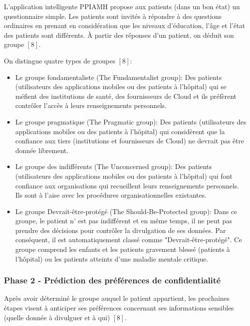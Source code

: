 L'application intelligente PPIAMH propose aux patients (dans un bon état) un questionnaire simple. Les patients sont invités à répondre à des questions ordinaires en prenant en considération que les niveaux d'éducation, l'âge et l'état des patients sont différents. À partir des réponses d'un patient, on déduit son groupe $[8]$.

\vspace{6pt}
\paragraphmark

On distingue quatre types de groupes $[8]$:

\vspace{6pt}
\paragraphmark

\begin{itemize}
	\item Le groupe fondamentaliste (The Fundamentalist group): Des patients (utilisateurs des applications mobiles ou des patients à l'hôpital) qui se méfient des institutions de santé, des fournisseurs de Cloud et ils préfèrent contrôler l'accès à leurs renseignements personnels.
	\item Le groupe pragmatique (The Pragmatic group): Des patients (utilisateurs des applications mobiles ou des patients à l'hôpital) qui considèrent que la confiance aux tiers (institutions et fournisseurs de Cloud) ne devrait pas être donnée librement.
	\item Le groupe des indifférents (The Unconcerned group): Des patients (utilisateurs des applications mobiles ou des patients à l'hôpital) qui font confiance aux organisations qui recueillent leurs renseignements personnels. Ils sont à l'aise avec les procédures organisationnelles existantes.
	\item Le groupe Devrait-être-protégé (The Should-Be-Protected group): Dans ce groupe, le patient n' est pas indifférent et en même temps, il ne peut pas prendre des décisions pour contrôler la divulgation de ses données. Par conséquent, il est automatiquement classé comme "Devrait-être-protégé". Ce groupe comprend les enfants et les patients gravement blessé (patients à l'hôpital) ou les patients atteints d'une maladie mentale critique.
\end{itemize}

\subsubsection{Phase 2 - Prédiction des préférences de confidentialité}

Après avoir déterminé le groupe auquel le patient appartient, les prochaines étapes visent à anticiper ses préférences concernant ses informations sensibles (quelle donnée à divulguer et à qui) $[8]$.

